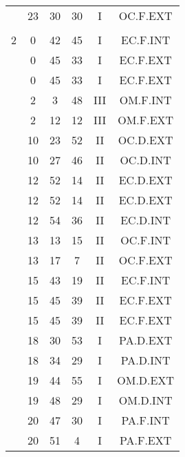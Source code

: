\documentclass[12pt, a4paper]{article}
\begin{document}
\begin{multicols}{3}
{\begin{tabular}{c c c c c c}
	 	 	 	 & 23 & 30 & 30 & I & OC.F.EXT\\%
	 	 	 	 & & & & & \\%
	 	 	 	2 & 0 & 42 & 45 & I & EC.F.INT\\%
	 	 	 	 & 0 & 45 & 33 & I & EC.F.EXT\\%
	 	 	 	 & 0 & 45 & 33 & I & EC.F.EXT\\%
	 	 	 	 & 2 & 3 & 48 & III & OM.F.INT\\%
	 	 	 	 & 2 & 12 & 12 & III & OM.F.EXT\\%
	 	 	 	 & 10 & 23 & 52 & II & OC.D.EXT\\%
	 	 	 	 & 10 & 27 & 46 & II & OC.D.INT\\%
	 	 	 	 & 12 & 52 & 14 & II & EC.D.EXT\\%
	 	 	 	 & 12 & 52 & 14 & II & EC.D.EXT\\%
	 	 	 	 & 12 & 54 & 36 & II & EC.D.INT\\%
	 	 	 	 & 13 & 13 & 15 & II & OC.F.INT\\%
	 	 	 	 & 13 & 17 & 7 & II & OC.F.EXT\\%
	 	 	 	 & 15 & 43 & 19 & II & EC.F.INT\\%
	 	 	 	 & 15 & 45 & 39 & II & EC.F.EXT\\%
	 	 	 	 & 15 & 45 & 39 & II & EC.F.EXT\\%
	 	 	 	 & 18 & 30 & 53 & I & PA.D.EXT\\%
	 	 	 	 & 18 & 34 & 29 & I & PA.D.INT\\%
	 	 	 	 & 19 & 44 & 55 & I & OM.D.EXT\\%
	 	 	 	 & 19 & 48 & 29 & I & OM.D.INT\\%
	 	 	 	 & 20 & 47 & 30 & I & PA.F.INT\\%
	 	 	 	 & 20 & 51 & 4 & I & PA.F.EXT\\%

\end{tabular}}
\end{multicols}
\end{document}
